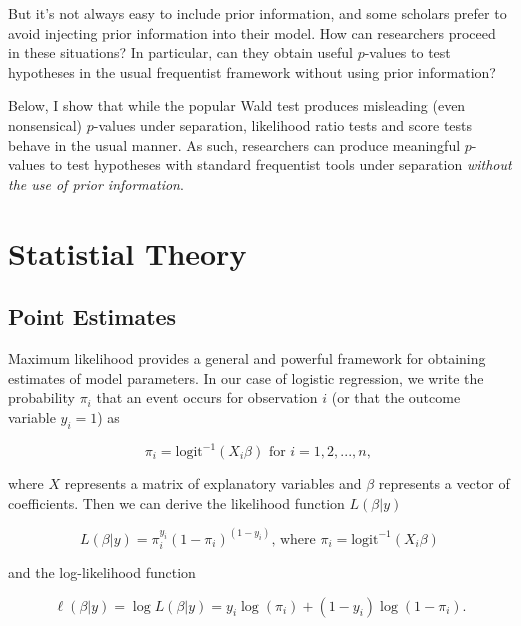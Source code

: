 \documentclass[
]{article}
\begin{document}
But it's not always easy to include prior information, and some scholars
prefer to avoid injecting prior information into their model. How can
researchers proceed in these situations? In particular, can they obtain
useful \(p\)-values to test hypotheses in the usual frequentist
framework without using prior information?

Below, I show that while the popular Wald test produces misleading (even
nonsensical) \(p\)-values under separation, likelihood ratio tests and
score tests behave in the usual manner. As such, researchers can produce
meaningful \(p\)-values to test hypotheses with standard frequentist
tools under separation \emph{without the use of prior information}.

\hypertarget{statistial-theory}{%
\section{Statistial Theory}\label{statistial-theory}}

\hypertarget{point-estimates}{%
\subsection{Point Estimates}\label{point-estimates}}

Maximum likelihood provides a general and powerful framework for
obtaining estimates of model parameters. In our case of logistic
regression, we write the probability \(\pi_i\) that an event occurs for
observation \(i\) (or that the outcome variable \(y_i = 1\)) as

\begin{equation}
\pi_i = \text{logit}^{-1}(X_i\beta)\text{ for } i = 1, 2, ... , n \text{, }
\end{equation}

\noindent where \(X\) represents a matrix of explanatory variables and
\(\beta\) represents a vector of coefficients. Then we can derive the
likelihood function \(L(\beta | y)\)

\begin{equation}
L(\beta | y) = \pi_{i}^{y_i}(1 - \pi_{i})^{(1 - y_i)}\text{,  where } \pi_i = \text{logit}^{-1}(X_i\beta)
\end{equation}

\noindent and the log-likelihood function

\begin{equation}
\ell(\beta | y) = \log L(\beta | y) = y_i \log(\pi_{i}) + (1 - y_i) \log(1 - \pi_{i}).
\end{equation}
\end{document}
